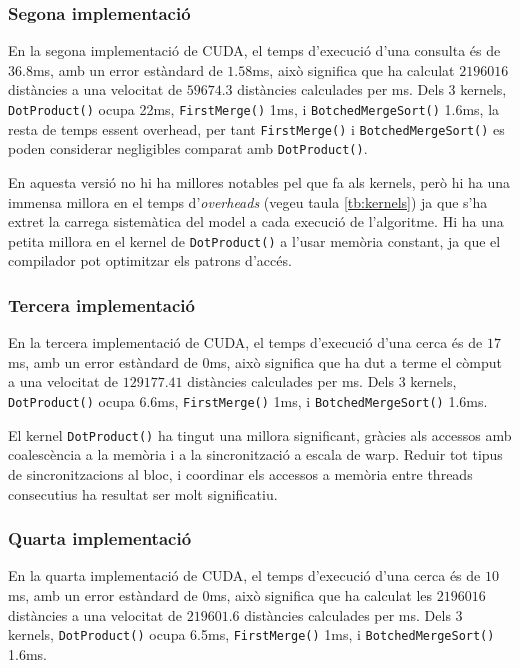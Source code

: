 \documentclass[catalan,10pt,a4paper]{article}
\begin{document}
\subsubsection*{Segona implementació}
En la segona implementació de CUDA, el temps d'execució d'una consulta és de $36.8$ms, amb un error estàndard de $1.58$ms, això significa que ha calculat $2196016$ distàncies a una velocitat de $59674.3$ distàncies calculades per ms. Dels 3 kernels, \verb|DotProduct()| ocupa 22ms, \verb|FirstMerge()| 1ms, i \verb|BotchedMergeSort()| 1.6ms, la resta de temps essent overhead, per tant \verb|FirstMerge()| i \verb|BotchedMergeSort()| es poden considerar negligibles comparat amb \verb|DotProduct()|.

En aquesta versió no hi ha millores notables pel que fa als kernels, però hi ha una immensa millora en el temps d'\textit{overheads} (vegeu taula \ref{tb:kernels})  ja que s'ha extret la carrega sistemàtica del model a cada execució de l'algoritme. Hi ha una petita millora en el kernel de \verb|DotProduct()| a l'usar memòria constant, ja que el compilador pot optimitzar els patrons d'accés.
\subsubsection*{Tercera implementació}
En la tercera implementació de CUDA, el temps d'execució d'una cerca és de $17$ms, amb un error estàndard de $0$ms, això significa que ha dut a terme el còmput a una velocitat de $129177.41$ distàncies calculades per ms. Dels 3 kernels, \verb|DotProduct()| ocupa 6.6ms, \verb|FirstMerge()| 1ms, i \verb|BotchedMergeSort()| 1.6ms. 

El kernel \verb|DotProduct()| ha tingut una millora significant, gràcies als accessos amb coalescència a la memòria i a la sincronització a escala de warp. Reduir tot tipus de sincronitzacions al bloc, i coordinar els accessos a memòria entre threads consecutius ha resultat ser molt significatiu.
\subsubsection*{Quarta implementació}
En la quarta implementació de CUDA, el temps d'execució d'una cerca és de $10$ms, amb un error estàndard de $0$ms, això significa que ha calculat les $2196016$ distàncies a una velocitat de $219601.6$ distàncies calculades per ms. Dels 3 kernels, \verb|DotProduct()| ocupa 6.5ms, \verb|FirstMerge()| 1ms, i \verb|BotchedMergeSort()| 1.6ms.
 
\end{document}
